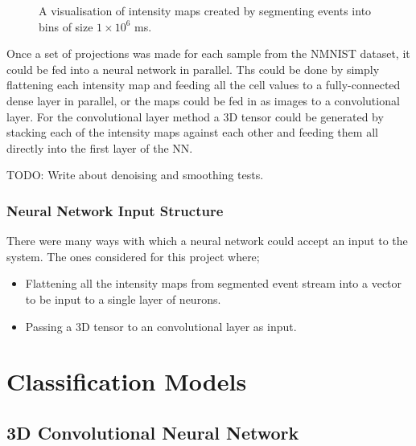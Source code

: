 \begin{figure}[htb]
    \caption{A visualisation of intensity maps created by segmenting events into bins of size $ 1 \times 10^6 $ ms.}%
    \label{fig:nmnist_spikes_to_intensity_map}%
\end{figure}

Once a set of projections was made for each sample from the NMNIST dataset, it could be fed into a neural network in parallel. Ths could be done by simply flattening each intensity map and feeding all the cell values to a fully-connected dense layer in parallel, or the maps could be fed in as images to a convolutional layer. For the convolutional layer method a 3D tensor could be generated by stacking each of the intensity maps against each other and feeding them all directly into the first layer of the NN.

\color{red} TODO: Write about denoising and smoothing tests. \color{black}

\subsubsection{Neural Network Input Structure}

There were many ways with which a neural network could accept an input to the system. The ones considered for this project where;

\begin{itemize}
    \item Flattening all the intensity maps from segmented event stream into a vector to be input to a single layer of neurons.
    \item Passing a 3D tensor to an convolutional layer as input.
\end{itemize}

\section{Classification Models}

\subsection{3D Convolutional Neural Network}

